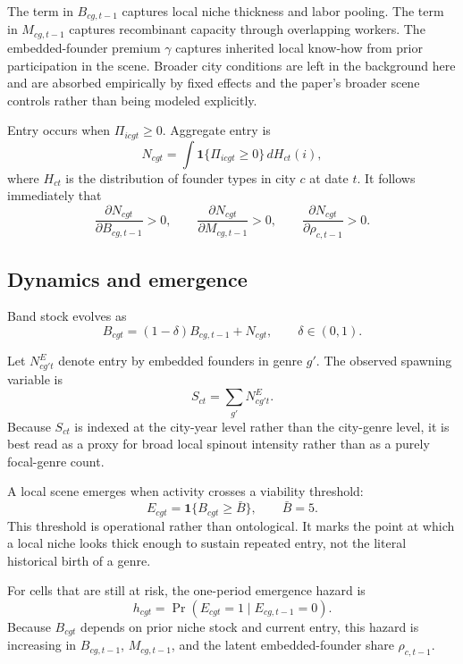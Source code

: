 The term in $B_{cg,t-1}$ captures local niche thickness and labor pooling. The term in
$M_{cg,t-1}$ captures recombinant capacity through overlapping workers. The embedded-founder
premium $\gamma$ captures inherited local know-how from prior participation in the scene. Broader
city conditions are left in the background here and are absorbed empirically by fixed effects and
the paper's broader scene controls rather than being modeled explicitly.

Entry occurs when $\Pi_{icgt} \ge 0$. Aggregate entry is
\begin{equation}
N_{cgt}
=
\int \mathbf{1}\{\Pi_{icgt} \ge 0\} \, dH_{ct}(i),
\end{equation}
where $H_{ct}$ is the distribution of founder types in city $c$ at date $t$. It follows
immediately that
\[
\frac{\partial N_{cgt}}{\partial B_{cg,t-1}} > 0,
\qquad
\frac{\partial N_{cgt}}{\partial M_{cg,t-1}} > 0,
\qquad
\frac{\partial N_{cgt}}{\partial \rho_{c,t-1}} > 0.
\]

\subsection*{Dynamics and emergence}

Band stock evolves as
\begin{equation}
B_{cgt} = (1 - \delta) B_{cg,t-1} + N_{cgt},
\qquad
\delta \in (0,1).
\end{equation}

Let $N^E_{cg't}$ denote entry by embedded founders in genre $g'$. The observed spawning variable is
\begin{equation}
S_{ct} = \sum_{g'} N^E_{cg't}.
\end{equation}
Because $S_{ct}$ is indexed at the city-year level rather than the city-genre level, it is best
read as a proxy for broad local spinout intensity rather than as a purely focal-genre count.

A local scene emerges when activity crosses a viability threshold:
\begin{equation}
E_{cgt} = \mathbf{1}\{B_{cgt} \ge \bar{B}\},
\qquad
\bar{B} = 5.
\end{equation}
This threshold is operational rather than ontological. It marks the point at which a local niche
looks thick enough to sustain repeated entry, not the literal historical birth of a genre.

For cells that are still at risk, the one-period emergence hazard is
\begin{equation}
h_{cgt} = \Pr(E_{cgt} = 1 \mid E_{cg,t-1} = 0).
\end{equation}
Because $B_{cgt}$ depends on prior niche stock and current entry, this hazard is increasing in
$B_{cg,t-1}$, $M_{cg,t-1}$, and the latent embedded-founder share $\rho_{c,t-1}$.

